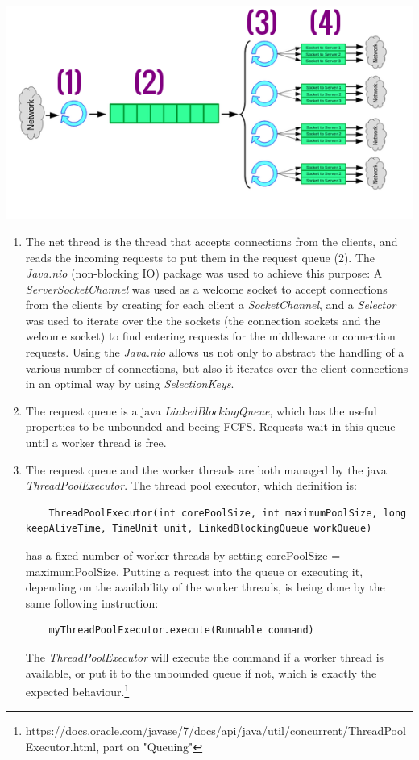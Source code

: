 \documentclass[11pt,a4paper]{article}
\begin{document}
\begin{center}
\includegraphics[scale=0.7]{baseIm.png}
\end{center}
\begin{enumerate}[ {(}1{)} ]
\item The net thread is the thread that accepts connections from the clients, and reads the incoming requests to put them in the request queue (2). The \textit{Java.nio} (non-blocking IO) package was used to achieve this purpose: A \textit{ServerSocketChannel} was used as a welcome socket to accept connections from the clients by creating for each client a \textit{SocketChannel}, and a \textit{Selector} was used to iterate over the the sockets (the connection sockets and the welcome socket) to find entering requests for the middleware or connection requests. Using the \textit{Java.nio} allows us not only to abstract the handling of a various number of connections, but also it iterates over the client connections in an optimal way by using \textit{SelectionKeys}. 
\item The request queue is a java \textit{LinkedBlockingQueue}, which has the useful properties to be unbounded and beeing FCFS. Requests wait in this queue until a worker thread is free.   

\item The request queue and the worker threads are both managed by the java \textit{ThreadPoolExecutor}. The thread pool executor, which definition is: 
\begin{lstlisting}
	ThreadPoolExecutor(int corePoolSize, int maximumPoolSize, long keepAliveTime, TimeUnit unit, LinkedBlockingQueue workQueue)
\end{lstlisting} 
has a fixed number of worker threads by setting corePoolSize = maximumPoolSize. Putting a request into the queue or executing it, depending on the availability of the worker threads, is being done by the same following instruction:
\begin{lstlisting}
	myThreadPoolExecutor.execute(Runnable command)
\end{lstlisting}
The \textit{ThreadPoolExecutor} will execute the command if a worker thread is available, or put it to the unbounded queue if not, which is exactly the expected behaviour.\footnote{https://docs.oracle.com/javase/7/docs/api/java/util/concurrent/ThreadPoolExecutor.html, part on "Queuing"}     
 

\end{enumerate}
\end{document}
